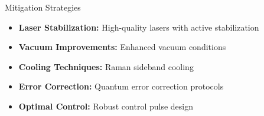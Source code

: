 \begin{frame}{Mitigation Strategies}
    \begin{itemize}
        \item \textbf{Laser Stabilization:} High-quality lasers with active stabilization
        \item \textbf{Vacuum Improvements:} Enhanced vacuum conditions
        \item \textbf{Cooling Techniques:} Raman sideband cooling
        \item \textbf{Error Correction:} Quantum error correction protocols
        \item \textbf{Optimal Control:} Robust control pulse design
    \end{itemize}
\end{frame}
